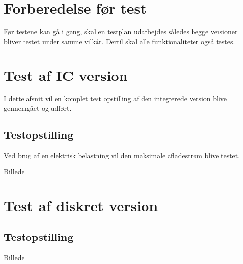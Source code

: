 \section{Forberedelse før test}\label{afs:tests}

Før testene kan gå i gang, skal en testplan udarbejdes således begge versioner bliver testet under samme vilkår. Dertil skal alle funktionaliteter også testes.
\\

\section{Test af IC version}\label{afs:test_ic}
I dette afsnit vil en komplet test opstilling af den integrerede version blive gennemgået og udført.

\subsection{Testopstilling}
Ved brug af en elektrisk belastning vil den maksimale afladestrøm blive testet.



Billede

\section{Test af diskret version}\label{afs:test_diskret}


\subsection{Testopstilling}
Billede

